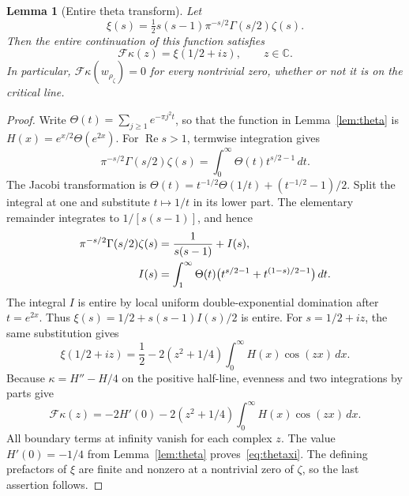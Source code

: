 \documentclass[11pt,a4paper]{article}
\numberwithin{equation}{section}
\newtheorem{lemma}[theorem]{Lemma}
\theoremstyle{definition}
\theoremstyle{remark}
\newcommand{\C}{\mathbb C}
\begin{document}
\begin{lemma}[Entire theta transform]\label{lem:thetaxi}
Let
\[
 \xi(s)=\tfrac12s(s-1)\pi^{-s/2}\Gamma(s/2)\zeta(s).
\]
Then the entire continuation of this function satisfies
\begin{equation}\label{eq:thetaxi}
 \mathcal F\kappa(z)=\xi(1/2+iz),\qquad z\in\C.
\end{equation}
In particular, $\mathcal F\kappa(w_{\rho_\zeta})=0$ for every nontrivial zero, whether or not it is on the critical line.
\end{lemma}
\begin{proof}
Write $\Theta(t)=\sum_{j\ge1}e^{-\pi j^2t}$, so that the function in Lemma~\ref{lem:theta} is $H(x)=e^{x/2}\Theta(e^{2x})$. For $\operatorname{Re}s>1$, termwise integration gives
\[
 \pi^{-s/2}\Gamma(s/2)\zeta(s)
   =\int_0^\infty\Theta(t)t^{s/2-1}\,dt.
\]
The Jacobi transformation is
$\Theta(t)=t^{-1/2}\Theta(1/t)+(t^{-1/2}-1)/2$.
Split the integral at one and substitute $t\mapsto1/t$ in its lower part. The elementary remainder integrates to $1/[s(s-1)]$, and hence
\begin{align}\label{eq:mellintheta}
 \pi^{-s/2}\Gamma(s/2)\zeta(s)
 &=\frac1{s(s-1)}+I(s),\notag\\
 I(s)&=\int_1^\infty\Theta(t)
       \bigl(t^{s/2-1}+t^{(1-s)/2-1}\bigr)\,dt.
\end{align}
The integral $I$ is entire by local uniform double-exponential domination after $t=e^{2x}$. Thus
$\xi(s)=1/2+s(s-1)I(s)/2$ is entire. For $s=1/2+iz$, the same substitution gives
\begin{equation}\label{eq:xiH}
 \xi(1/2+iz)=\frac12
       -2(z^2+1/4)\int_0^\infty H(x)\cos(zx)\,dx.
\end{equation}
Because $\kappa=H''-H/4$ on the positive half-line, evenness and two integrations by parts give
\[
 \mathcal F\kappa(z)
  =-2H'(0)-2(z^2+1/4)\int_0^\infty H(x)\cos(zx)\,dx.
\]
All boundary terms at infinity vanish for each complex $z$. The value $H'(0)=-1/4$ from Lemma~\ref{lem:theta} proves~\eqref{eq:thetaxi}. The defining prefactors of $\xi$ are finite and nonzero at a nontrivial zero of $\zeta$, so the last assertion follows.
\end{proof}
\end{document}
